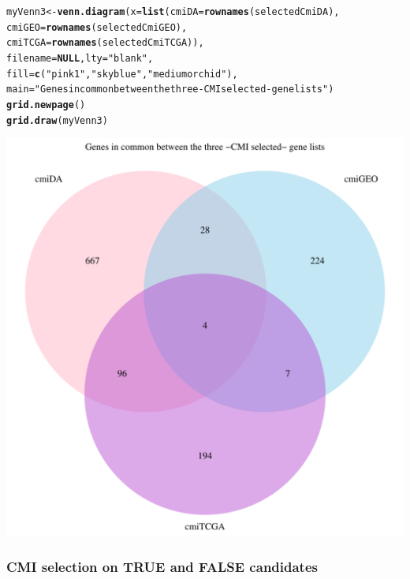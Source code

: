 \documentclass[a4paper,10pt]{article}\usepackage[]{graphicx}\usepackage[]{color}
\makeatletter
\def\maxwidth{ %
  \ifdim\Gin@nat@width>\linewidth
    \linewidth
  \else
    \Gin@nat@width
  \fi
}
\newcommand{\hlstr}[1]{\textcolor[rgb]{0.192,0.494,0.8}{#1}}%
\newcommand{\hlstd}[1]{\textcolor[rgb]{0.345,0.345,0.345}{#1}}%
\newcommand{\hlkwa}[1]{\textcolor[rgb]{0.161,0.373,0.58}{\textbf{#1}}}%
\newcommand{\hlkwb}[1]{\textcolor[rgb]{0.69,0.353,0.396}{#1}}%
\newcommand{\hlkwc}[1]{\textcolor[rgb]{0.333,0.667,0.333}{#1}}%
\newcommand{\hlkwd}[1]{\textcolor[rgb]{0.737,0.353,0.396}{\textbf{#1}}}%
\newenvironment{kframe}{%
 \def\at@end@of@kframe{}%
 \ifinner\ifhmode%
  \def\at@end@of@kframe{\end{minipage}}%
  \begin{minipage}{\columnwidth}%
 \fi\fi%
 \def\FrameCommand##1{\hskip\@totalleftmargin \hskip-\fboxsep
 \colorbox{shadecolor}{##1}\hskip-\fboxsep
     \hskip-\linewidth \hskip-\@totalleftmargin \hskip\columnwidth}%
 \MakeFramed {\advance\hsize-\width
   \@totalleftmargin\z@ \linewidth\hsize
   \@setminipage}}%
 {\par\unskip\endMakeFramed%
 \at@end@of@kframe}
\newenvironment{knitrout}{}{} %
\makeatother
\begin{document}
\begin{knitrout}
\color{fgcolor}\begin{kframe}
\begin{alltt}
\hlstd{myVenn3}\hlkwb{<-} \hlkwd{venn.diagram}\hlstd{(}\hlkwc{x}\hlstd{=}\hlkwd{list}\hlstd{(}\hlkwc{cmiDA}\hlstd{=}\hlkwd{rownames}\hlstd{(selectedCmiDA),}
                              \hlkwc{cmiGEO}\hlstd{=}\hlkwd{rownames}\hlstd{(selectedCmiGEO),}
                              \hlkwc{cmiTCGA}\hlstd{=}\hlkwd{rownames}\hlstd{(selectedCmiTCGA)),}
                              \hlkwc{filename}\hlstd{=}\hlkwa{NULL}\hlstd{,} \hlkwc{lty} \hlstd{=} \hlstr{"blank"}\hlstd{,}
                              \hlkwc{fill}\hlstd{=}\hlkwd{c}\hlstd{(}\hlstr{"pink1"}\hlstd{,} \hlstr{"skyblue"}\hlstd{,} \hlstr{"mediumorchid"}\hlstd{),}
                       \hlkwc{main}\hlstd{=}\hlstr{"Genes in common between the three -CMI selected- gene lists"}\hlstd{)}
\hlkwd{grid.newpage}\hlstd{()}
\hlkwd{grid.draw}\hlstd{(myVenn3)}
\end{alltt}
\end{kframe}
\includegraphics[width=\maxwidth]{figure/vennCommonGenesin3listsCMI-1} 

\end{knitrout}

\subsubsection{CMI selection on TRUE and FALSE candidates}
\end{document}
